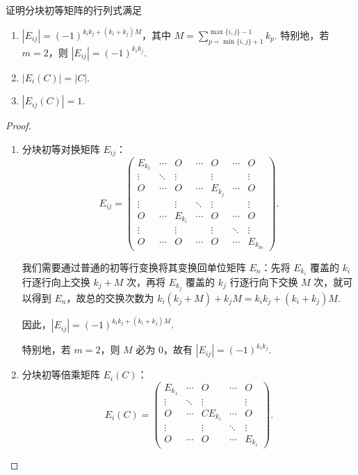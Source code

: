 \begin{example}{}{}
    证明分块初等矩阵的行列式满足

    \begin{enumerate}
        \item $|E_{ij}| = (-1)^{k_i k_j + (k_i + k_j) M}$，其中 $M=\displaystyle\sum_{p=\min\{i,j\} + 1}^{\max\{i,j\} - 1} k_p$. 特别地，若 $m=2$，则 $|E_{ij}| = (-1)^{k_i k_j}$.
        \item $|E_i(C)| = |C|$.
        \item $|E_{ij}(C)| = 1$.
    \end{enumerate}
\end{example}

\begin{proof}
    \begin{enumerate}
        \item 分块初等对换矩阵 $E_{ij}$：
            \[
                E_{ij} = \begin{pmatrix}
                    E_{k_1} & \cdots & O       & \cdots & O       & \cdots & O       \\
                    \vdots  & \ddots & \vdots  &        & \vdots  &        & \vdots  \\
                    O       & \cdots & O       & \cdots & E_{k_j} & \cdots & O       \\
                    \vdots  &        & \vdots  & \ddots & \vdots  &        & \vdots  \\
                    O       & \cdots & E_{k_i} & \cdots & O       & \cdots & O       \\
                    \vdots  &        & \vdots  &        & \vdots  & \ddots & \vdots  \\
                    O       & \cdots & O       & \cdots & O       & \cdots & E_{k_m}
                \end{pmatrix}.
            \]

            我们需要通过普通的初等行变换将其变换回单位矩阵 $E_n$：先将 $E_{k_i}$ 覆盖的 $k_i$ 行逐行向上交换 $k_j + M$ 次，再将 $E_{k_j}$ 覆盖的 $k_j$ 行逐行向下交换 $M$ 次，就可以得到 $E_n$，故总的交换次数为 $k_i(k_j+M) + k_j M = k_i k_j + (k_i + k_j) M$.

            因此，$|E_{ij}| = (-1)^{k_i k_j + (k_i + k_j) M}$.

            特别地，若 $m=2$，则 $M$ 必为 $0$，故有 $|E_{ij}| = (-1)^{k_i k_j}$.

        \item 分块初等倍乘矩阵 $E_i(C)$：
            \[
                E_i(C) = \begin{pmatrix}
                    E_{k_1} & \cdots & O        & \cdots & O       \\
                    \vdots  & \ddots & \vdots   &        & \vdots  \\
                    O       & \cdots & CE_{k_i} & \cdots & O       \\
                    \vdots  &        & \vdots   & \ddots & \vdots  \\
                    O       & \cdots & O        & \cdots & E_{k_i}
                \end{pmatrix}.
            \]


\end{enumerate}
\end{proof}
